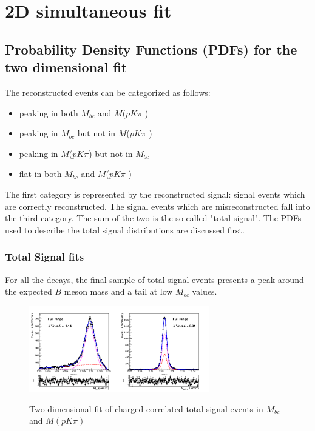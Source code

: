 \chapter{2D simultaneous fit}


\label{sec:2DsimFit}
\section{Probability Density Functions (PDFs) for the two dimensional fit}\label{sec:2Dpdf}

The reconstructed events can be categorized as follows:
\begin{itemize}
    \item peaking in both $M_{bc}$ and $M$($p K \pi$ )
    \item peaking in $M_{bc}$ but not in $M$($p K \pi$ )
    \item peaking in $M$($p K \pi$) but not in $M_{bc}$
    \item flat in both $M_{bc}$ and $M$($p K \pi$ )
\end{itemize}

The first category is represented by the reconstructed signal: signal events which are correctly reconstructed. The signal events which are misreconstructed fall into the third category. The sum of the two is the so called "total signal".
The PDFs used to describe the total signal distributions are discussed first.

\subsection{Total Signal fits}
For all the decays, the final sample of total signal events presents a peak around the expected $B$ meson mass and a tail at low $M_{bc}$ values.

\begin{figure}
\centering

{\includegraphics[width=0.7\textwidth]{04-SimultaneousFit/figs/5streams_TotalSignal_charged_corrLambdaC_2Dfit.png}}
\caption{Two dimensional fit of charged correlated total signal events in $M_{bc}$  and $M(p K \pi)$ }
\label{fig:5streams_TotalSignal_charged_corrLambdaC_2Dfit}
\end{figure}


